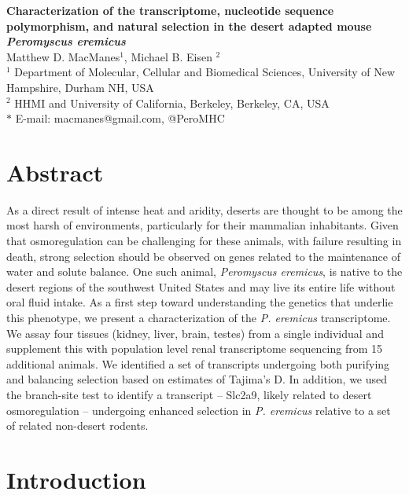 \documentclass[12pt]{article}
\date{}
\newcommand{\peer}{\textit{P. eremicus}}
\begin{document}
\begin{flushleft}
{\Large
\textbf{Characterization of the transcriptome, nucleotide sequence polymorphism, and natural selection in the desert adapted mouse \textit{Peromyscus eremicus}}
}
\\
Matthew D. MacManes$^{1}$, 
Michael B. Eisen $^{2}$
\\
$^{1}$ Department of Molecular, Cellular and Biomedical Sciences, University of New Hampshire, Durham NH, USA
\\
$^{2}$ HHMI and University of California, Berkeley, Berkeley, CA, USA
\\
$\ast$ E-mail: macmanes@gmail.com, @PeroMHC
\end{flushleft}

\linenumbers

\section*{Abstract}

As a direct result of intense heat and aridity, deserts are thought to be among the most harsh of environments, particularly for their mammalian inhabitants. Given that osmoregulation can be challenging for these animals, with failure resulting in death, strong selection should be observed on genes related to the maintenance of water and solute balance. One such animal, \textit{Peromyscus eremicus}, is native to the desert regions of the southwest United States and may live its entire life without oral fluid intake. As a first step toward understanding the genetics that underlie this phenotype, we present a characterization of the \peer\: transcriptome. We assay four tissues (kidney, liver, brain, testes) from a single individual and supplement this with population level renal transcriptome sequencing from 15 additional animals. We identified a set of transcripts undergoing both purifying and balancing selection based on estimates of Tajima's D. In addition, we used the branch-site test to identify a transcript -- Slc2a9, likely related to desert osmoregulation -- undergoing enhanced selection in \peer\: relative to a set of related non-desert rodents.  \\


\section*{Introduction}
\end{document}
